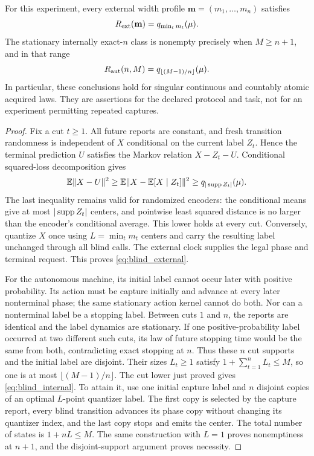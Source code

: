 \begin{theorem}\label{thm:blind}
For this experiment, every external width profile $\mathbf m=(m_1,\ldots,m_n)$ satisfies
\begin{equation}\label{eq:blind_external}
 R_{\mathrm{ext}}(\mathbf m)=q_{\min_t m_t}(\mu).
\end{equation}
The stationary internally exact-$n$ class is nonempty precisely when $M\ge n+1$, and in that range
\begin{equation}\label{eq:blind_internal}
 R_{\mathrm{aut}}(n,M)=q_{\lfloor(M-1)/n\rfloor}(\mu).
\end{equation}
In particular, these conclusions hold for singular continuous and countably atomic acquired laws. They are assertions for the declared protocol and task, not for an experiment permitting repeated captures.
\end{theorem}
\begin{proof}
Fix a cut $t\ge1$. All future reports are constant, and fresh transition randomness is independent of $X$ conditional on the current label $Z_t$. Hence the terminal prediction $U$ satisfies the Markov relation $X-Z_t-U$. Conditional squared-loss decomposition gives
\[
 \mathbb E\|X-U\|^2\ge \mathbb E\|X-\mathbb E[X\mid Z_t]\|^2\ge q_{|\operatorname{supp} Z_t|}(\mu).
\]
The last inequality remains valid for randomized encoders: the conditional means give at most $|\operatorname{supp} Z_t|$ centers, and pointwise least squared distance is no larger than the encoder's conditional average. This lower holds at every cut. Conversely, quantize $X$ once using $L=\min_t m_t$ centers and carry the resulting label unchanged through all blind calls. The external clock supplies the legal phase and terminal request. This proves \eqref{eq:blind_external}.

For the autonomous machine, its initial label cannot occur later with positive probability. Its action must be capture initially and advance at every later nonterminal phase; the same stationary action kernel cannot do both. Nor can a nonterminal label be a stopping label. Between cuts $1$ and $n$, the reports are identical and the label dynamics are stationary. If one positive-probability label occurred at two different such cuts, its law of future stopping time would be the same from both, contradicting exact stopping at $n$. Thus these $n$ cut supports and the initial label are disjoint. Their sizes $L_t\ge1$ satisfy $1+\sum_{t=1}^nL_t\le M$, so one is at most $\lfloor(M-1)/n\rfloor$. The cut lower just proved gives \eqref{eq:blind_internal}. To attain it, use one initial capture label and $n$ disjoint copies of an optimal $L$-point quantizer label. The first copy is selected by the capture report, every blind transition advances its phase copy without changing its quantizer index, and the last copy stops and emits the center. The total number of states is $1+nL\le M$. The same construction with $L=1$ proves nonemptiness at $n+1$, and the disjoint-support argument proves necessity.
\end{proof}

